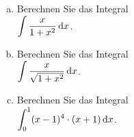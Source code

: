 \exercise
\begin{enumerate}[(a)]
\item Berechnen Sie das Integral
      \\[0.2cm]
      \hspace*{1.3cm}
      $\displaystyle\int\frac{x}{1 + x^2} \, \textrm{d} x$.
\item Berechnen Sie das Integral
      \\[0.2cm]
      \hspace*{1.3cm}
      $\displaystyle\int\frac{x}{\sqrt{1 + x^2}} \, \textrm{d} x$.
\item Berechnen Sie das Integral
      \\[0.2cm]
      \hspace*{1.3cm}
      $\displaystyle\int_0^1 (x-1)^4 \cdot (x+1) \, \textrm{d} x$.
      \eox
\end{enumerate}


